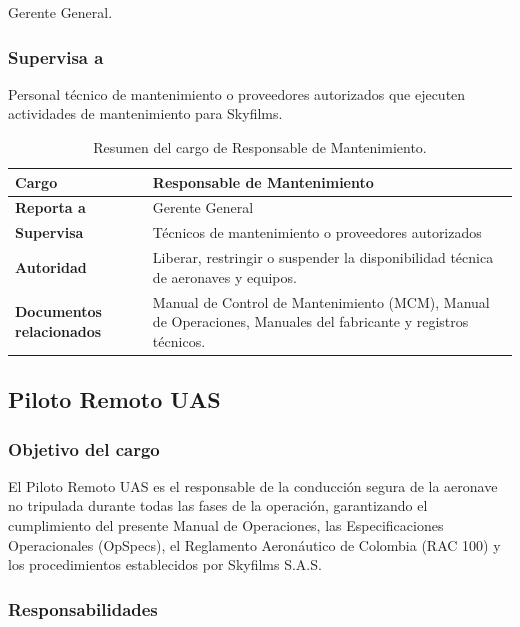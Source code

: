 Gerente General.


\subsubsection*{Supervisa a}

Personal técnico de mantenimiento o proveedores autorizados que ejecuten actividades de mantenimiento para Skyfilms.

\begin{table}[H]
\centering
\renewcommand{\arraystretch}{1.3}

\begin{tabularx}{\textwidth}{|p{4cm}|X|}
\hline
\textbf{Cargo} & Responsable de Mantenimiento \\ \hline
\textbf{Reporta a} & Gerente General \\ \hline
\textbf{Supervisa} & Técnicos de mantenimiento o proveedores autorizados \\ \hline
\textbf{Autoridad} & Liberar, restringir o suspender la disponibilidad técnica de aeronaves y equipos. \\ \hline
\textbf{Documentos relacionados} & Manual de Control de Mantenimiento (MCM), Manual de Operaciones, Manuales del fabricante y registros técnicos. \\ \hline
\end{tabularx}

\caption{Resumen del cargo de Responsable de Mantenimiento.}

\end{table}



\subsection{Piloto Remoto UAS}

\subsubsection*{Objetivo del cargo}

El Piloto Remoto UAS es el responsable de la conducción segura de la aeronave no tripulada durante todas las fases de la operación, garantizando el cumplimiento del presente Manual de Operaciones, las Especificaciones Operacionales (OpSpecs), el Reglamento Aeronáutico de Colombia (RAC 100) y los procedimientos establecidos por Skyfilms S.A.S.


\subsubsection*{Responsabilidades}

